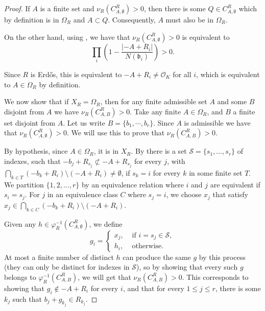 \documentclass[a4paper,11pt,reqno]{amsart}
\theoremstyle{plain}
\theoremstyle{remark}
\newcommand{\co}{\mathcal{O}}
\newcommand{\gb}{\mathfrak{b}}
\begin{document}
			\begin{proof}
				
				If $A$ is a finite set and $\nu_R(C^R_{A,\emptyset}) > 0$, then there is some $Q \in C^R_{A,\emptyset}$ which by definition is in $\Omega_R$ and $A \subset Q$. Consequently, $A$ must also be in $\Omega_R$.
				
				On the other hand, using , we have that $\nu_R(C^R_{A,\emptyset}) > 0$ is equivalent to $$\prod_i\left(1-\frac{|-A+R_i|}{N(\gb_i)}\right) >0.$$ 
				
				Since $R$ is Erdős, this is equivalent to $-A+R_i \neq \co_K$ for all $i$, which is equivalent to $A \in\Omega_{R}$ by definition.
				
				We now show that if $X_R = \Omega_R$, then for any finite admissible set $A$ and some $B$ disjoint from $A$ we have $\nu_R(C^R_{A,B}) > 0$.
				Take any finite $A \in \Omega_R$, and $B$ a finite set disjoint from $A$. Let us write $B = \{b_1,\cdots,b_r\}$. Since $A$ is admissible we have that $\nu_R(C^R_{A,\emptyset}) > 0$. We will use this to prove that $\nu_R(C^R_{A,B}) > 0$.
				
				
				By hypothesis, since $A \in \Omega_{R}$, it is in $X_R$. By    there is a set $\mathcal{S} = \{s_1,\dots, s_r\}$ of indexes, such that $-b_j +R_{s_j} \not \subset -A +R_{s_j} $ for every $j$, with $\bigcap_{k \in T} (-b_k + R_i) \setminus (-A+R_i) \neq \emptyset$, if $s_k = i$ for every $k$ in some finite set $T$. We partition $\{1,2,\dots,r\}$ by an equivalence relation where $i$ and $j$ are equivalent if $s_i = s_j$. For $j$ in an equivalence class $C$ where $s_j = i$, we choose $x_j$ that satisfy $x_j \in \bigcap_{k \in C} (-b_k + R_i) \setminus (-A+R_i)$.
				
				Given any $h \in \varphi_R^{-1}(C^R_{A,\emptyset})$, we define $$g_i = \begin{cases}
					x_j,  & \text{ if } i = s_j \in \mathcal{S}, \\
					h_i,
					& \text{ otherwise.} 
				\end{cases} $$ 
				At most a finite number of distinct $h$ can produce the same $g$ by this process (they can only be distinct for indexes in $\mathcal{S}$), so by showing that every such $g$ belongs to $\varphi_R^{-1}(C^R_{A,B})$, we will get that $\nu_R(C^R_{A,B}) >0$.  This corresponds to showing that $g_i \not \in -A + R_i$ for every $i$, and that for every $1\leq j \leq r$, there is some $k_j$ such that $b_j + g_{k_j} \in R_{k_j}$.
				

\end{proof}
\end{document}
